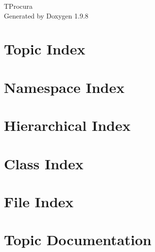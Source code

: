 \documentclass[twoside]{book}
\newcommand{\+}{\discretionary{\mbox{\scriptsize$\hookleftarrow$}}{}{}}
\newcommand{\clearemptydoublepage}{%
    \newpage{\pagestyle{empty}\cleardoublepage}%
  }
\begin{document}
  \raggedbottom
    \hypersetup{pageanchor=false,
                bookmarksnumbered=true,
                pdfencoding=unicode
               }
  \begin{titlepage}
  \vspace*{7cm}
  \begin{center}%
  {\Large TProcura}\\
  \vspace*{1cm}
  {\large Generated by Doxygen 1.9.8}\\
  \end{center}
  \end{titlepage}
  \clearemptydoublepage
  \tableofcontents
  \clearemptydoublepage
  \hypersetup{pageanchor=true}













\chapter{Topic Index}

\chapter{Namespace Index}

\chapter{Hierarchical Index}

\chapter{Class Index}

\chapter{File Index}

\chapter{Topic Documentation}







\end{document}
